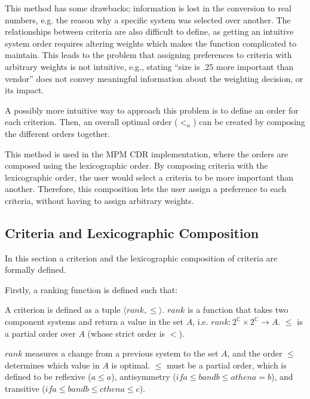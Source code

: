 This method has some drawbacks; information is lost in the conversion to real numbers, e.g. the reason why a specific system was selected over another.
The relationships between criteria are also difficult to define, as getting an intuitive system order requires altering weights which makes the function complicated to maintain.
This leads to the problem that assigning preferences to criteria with arbitrary weights is not intuitive,
e.g., stating ``size is $.25$ more important than vendor'' does not convey meaningful information about the weighting decision, or its impact.

A possibly more intuitive way to approach this problem is to define an order for each criterion.
Then, an overall optimal order ($<_{\alpha}$) can be created by composing the different orders together.

This method is used in the MPM \citep{abate2011} CDR implementation, where the orders are composed using the lexicographic order.
By composing criteria with the lexicographic order, the user would select a criteria to be more important than another. 
Therefore, this composition lets the user assign a preference to each criteria, without having to assign arbitrary weights.

\subsection{Criteria and Lexicographic Composition}
In this section a criterion and the lexicographic composition of criteria are formally defined.

Firstly, a ranking function is defined such that:
\begin{defs}
\label{formal.defcriteria}
A criterion is defined as a tuple $\langle rank, \leq \rangle$.
$rank$ is a function that takes two component systems and return a value in the set $A$, i.e. $rank : 2^{\mathbb{C}} \times 2^{\mathbb{C}} \rightarrow A$.
$\leq$ is a partial order over $A$ (whose strict order is $<$).
\end{defs}
$rank$ measures a change from a previous system to the set $A$, and the order $\leq$ determines which value in $A$ is optimal.
$\leq$ must be a partial order, which is defined to be reflexive ($a \leq a$), antisymmetry ($if a \leq b and b \leq a then a = b$), and transitive ($if a \leq b and b \leq c then a \leq c$).

